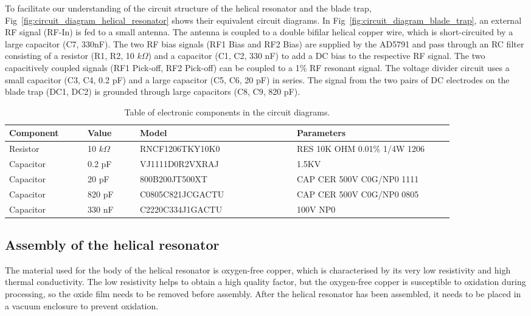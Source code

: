 To facilitate our understanding of the circuit structure of the helical resonator and the blade trap, Fig~\ref{fig:circuit_diagram_helical_resonator} shows their equivalent circuit diagrams. In Fig~\ref{fig:circuit_diagram_blade_trap}, an external RF signal (RF-In) is fed to a small antenna. The antenna is coupled to a double bifilar helical copper wire, which is short-circuited by a large capacitor (C7, 330nF). The two RF bias signals (RF1 Bias and RF2 Bias) are supplied by the AD5791 and pass through an RC filter consisting of a resistor (R1, R2, 10 $k\Omega$) and a capacitor (C1, C2, 330 nF) to add a DC bias to the respective RF signal. The two capacitively coupled signals (RF1 Pick-off, RF2 Pick-off) can be coupled to a 1\% RF resonant signal. The voltage divider circuit uses a small capacitor (C3, C4, 0.2 pF) and a large capacitor (C5, C6, 20 pF) in series. The signal from the two pairs of DC electrodes on the blade trap (DC1, DC2) is grounded through large capacitors (C8, C9, 820 pF).

\begin{table}
    \centering
    \caption{Table of electronic components in the circuit diagrams.}
    \begin{tabular}{p{0.15\linewidth}p{0.1\linewidth}p{0.3\linewidth}p{0.3\linewidth}}
        \toprule
        Component & Value        & Model            & Parameters                   \\
        \midrule
        Resistor  & 10 $k\Omega$ & RNCF1206TKY10K0  & RES 10K OHM 0.01\% 1/4W 1206 \\
        Capacitor & 0.2 pF       & VJ1111D0R2VXRAJ  & 1.5KV                        \\
        Capacitor & 20 pF        & 800B200JT500XT   & CAP CER  500V C0G/NP0 1111
        \\
        Capacitor & 820 pF       & C0805C821JCGACTU & CAP CER  500V C0G/NP0 0805   \\
        Capacitor & 330 nF       & C2220C334J1GACTU & 100V NP0
        \\
        \bottomrule
    \end{tabular}
\end{table}

\subsection{Assembly of the helical resonator}

The material used for the body of the helical resonator is oxygen-free copper, which is characterised by its very low resistivity and high thermal conductivity. The low resistivity helps to obtain a high quality factor, but the oxygen-free copper is susceptible to oxidation during processing, so the oxide film needs to be removed before assembly. After the helical resonator has been assembled, it needs to be placed in a vacuum enclosure to prevent oxidation.

